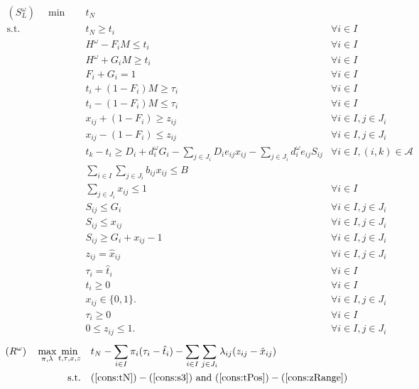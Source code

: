 \documentclass[11pt]{article}
\begin{document}
	\begin{subequations}
		\label{prob:subLocal}
		\begin{align}
		(S^\omega_L) \quad \min \quad & t_N & \\
		\text{s.t.} \quad & t_N \geq t_i & \forall i \in I \label{cons:tN}\\
		& H^\omega - F_i M \leq t_i & \forall i \in I \\
		& H^\omega + G_i M \geq t_i & \forall i \in I \\
		& F_i + G_i = 1 & \forall i \in I \\
		& t_i + (1-F_i) M \geq \tau_i & \forall i \in I\\
		& t_i - (1-F_i) M \leq \tau_i & \forall i \in I \\
		& x_{ij} + (1-F_i) \geq z_{ij} & \forall i \in I, j \in J_i \\
		& x_{ij} - (1-F_i) \leq z_{ij} & \forall i \in I, j \in J_i \\
		& t_k - t_i \geq D_i + d_i^\omega G_i -\sum_{j \in J_i} D_i e_{ij} x_{ij} - \sum_{j \in J_i} d_i^\omega e_{ij} S_{ij} & \forall i \in I, (i,k) \in \mathcal{A}\\
		&\sum_{i \in I} \sum_{j \in J_i} b_{ij} x_{ij} \leq B &\\
		& \sum_{j \in J_i} x_{ij} \leq 1 & \forall i \in I\\
		& S_{ij} \leq G_i & \forall i \in I, j \in J_i \\
		& S_{ij} \leq x_{ij} & \forall i \in I, j \in J_i\\
		& S_{ij} \geq G_i + x_{ij} - 1 & \forall i \in I, j \in J_i \label{cons:s3}\\
		& z_{ij} = \hat{x}_{ij} & \forall i \in I, j \in J_i \label{cons:local1}\\
		& \tau_{i} = \hat{t}_{i} & \forall i \in I \label{cons:local2}\\
		& t_i \geq 0 & \forall i \in I \label{cons:tPos}\\
		& x_{ij} \in \{0,1\}. & \forall i \in I, j \in J_i\\
		& \tau_i \geq 0 & \forall i \in I \\
		& 0 \leq z_{ij} \leq 1 . & \forall i \in I, j \in J_i \label{cons:zRange}
		\end{align}
	\end{subequations}
	\begin{subequations}
		\label{prob:LagDual}
		\begin{align}
		(R^\omega) \quad \max_{\pi,\lambda} \min_{t,\tau,x,z} \quad & t_N - \sum_{i \in I} \pi_i(\tau_{i} - \hat{t}_i) - \sum_{i \in I} \sum_{j \in J_i} \lambda_{ij}(z_{ij} - \hat{x}_{ij}) & \\
		\text{s.t.} \quad & (\ref{cons:tN}) - (\ref{cons:s3})\text{ and } (\ref{cons:tPos}) - (\ref{cons:zRange})
		\end{align}
	\end{subequations}
\end{document}

